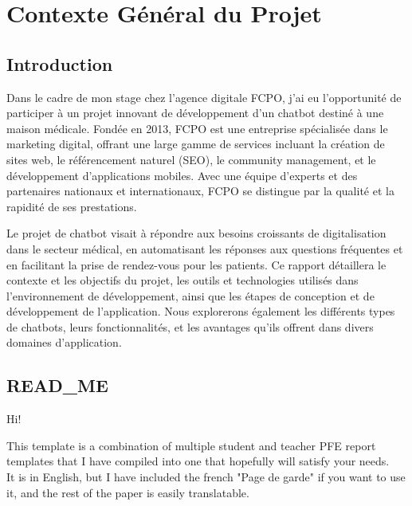 \chapter{Contexte Général du Projet}
\label{Contexte Général du Projet}


\section*{Introduction}

\hspace{16pt}Dans le cadre de mon stage chez l'agence digitale FCPO, j'ai eu l'opportunité de participer à un projet innovant de développement d'un chatbot destiné à une maison médicale. Fondée en 2013, FCPO est une entreprise spécialisée dans le marketing digital, offrant une large gamme de services incluant la création de sites web, le référencement naturel (SEO), le community management, et le développement d'applications mobiles. Avec une équipe d'experts et des partenaires nationaux et internationaux, FCPO se distingue par la qualité et la rapidité de ses prestations.

Le projet de chatbot visait à répondre aux besoins croissants de digitalisation dans le secteur médical, en automatisant les réponses aux questions fréquentes et en facilitant la prise de rendez-vous pour les patients. Ce rapport détaillera le contexte et les objectifs du projet, les outils et technologies utilisés dans l'environnement de développement, ainsi que les étapes de conception et de développement de l'application. Nous explorerons également les différents types de chatbots, leurs fonctionnalités, et les avantages qu'ils offrent dans divers domaines d'application.

\newpage

\section{READ\_ME}

Hi! 

This template is a combination of multiple student and teacher PFE report templates that I have compiled into one that hopefully will satisfy your needs.
\\

It is in English, but I have included the french "Page de garde" if you want to use it, and the rest of the paper is easily translatable.
\\

